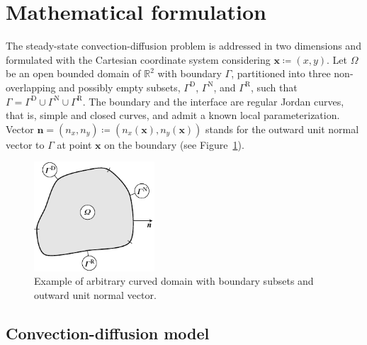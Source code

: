 \section{Mathematical formulation}
\label{chap2:sec:mathematical_formulation}

The steady-state convection-diffusion problem is addressed in two dimensions and formulated with the Cartesian coordinate system considering $\bm{x}\coloneqq\left(x,y\right)$.
Let $\Omega$ be an open bounded domain of $\mathbb{R}^{2}$ with boundary $\Gamma$, partitioned into three non-overlapping and possibly empty subsets, $\Gamma^{\textrm{D}}$, $\Gamma^{\textrm{N}}$, and $\Gamma^{\textrm{R}}$, such that $\Gamma=\Gamma^{\textrm{D}}\cup\Gamma^{\textrm{N}}\cup\Gamma^{\textrm{R}}$.
The boundary and the interface are regular Jordan curves, that is, simple and closed curves, and admit a known local parameterization.
Vector $\bm{n}=\left(n_{x},n_{y}\right)\coloneqq\left(n_{x}\left(\bm{x}\right),n_{y}\left(\bm{x}\right)\right)$ stands for the outward unit normal vector to $\Gamma$ at point $\bm{x}$ on the boundary (see Figure~\ref{chap2:fig:mathematical_formulation_domain}).

\begin{figure}[!htb]
\centering
\includegraphics[width=4.5cm]{chap2/include/tikz/curved_domain}
\caption{Example of arbitrary curved domain with boundary subsets and outward unit normal vector.}
\label{chap2:fig:mathematical_formulation_domain}
\end{figure}

\subsection{Convection-diffusion model}
\label{chap2:subsec:mathematical_formulation_convection_diffusion_model}

